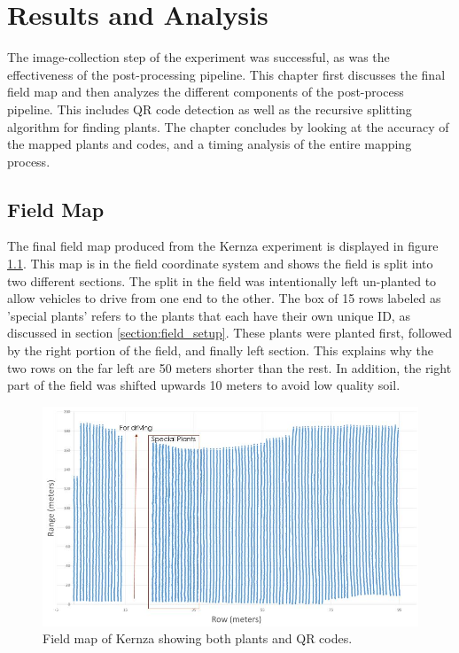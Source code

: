 
\cleardoublepage

\chapter{Results and Analysis}
\label{chapter:results}

The image-collection step of the experiment was successful, as was the effectiveness of the post-processing pipeline.  This chapter first discusses the final field map and then analyzes the different components of the post-process pipeline.  This includes QR code detection as well as the recursive splitting algorithm for finding plants.  The chapter concludes by looking at the accuracy of the mapped plants and codes, and a timing analysis of the entire mapping process.

\section{Field Map}

The final field map produced from the Kernza experiment is displayed in figure \ref{figure:field_map}.  This map is in the field coordinate system and shows the field is split into two different sections.  The split in the field was intentionally left un-planted to allow vehicles to drive from one end to the other.   The box of 15 rows labeled as 'special plants' refers to the plants that each have their own unique ID, as discussed in section \ref{section:field_setup}.  These plants were planted first, followed by the right portion of the field, and finally left section.  This explains why the two rows on the far left are 50 meters shorter than the rest. In addition, the right part of the field was shifted upwards 10 meters to avoid low quality soil.

\begin{figure}[htb]
	\centering
    \includegraphics[width=6in]{figures/field_map.jpg}
    \caption[Field map]{Field map of Kernza showing both plants and QR codes.}
    \label{figure:field_map}
\end{figure}

